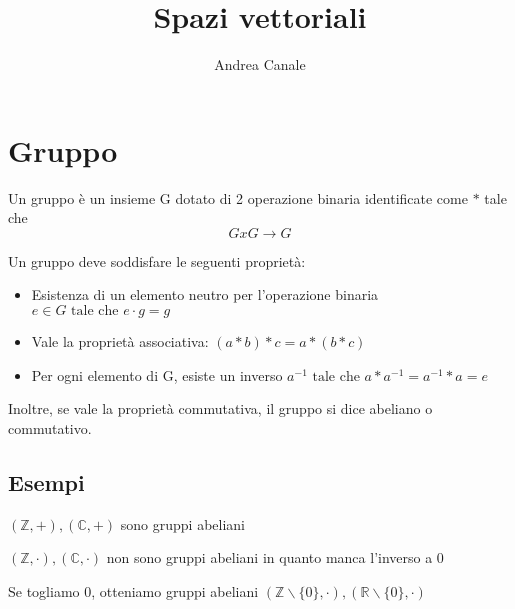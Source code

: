 \documentclass[a4paper, 10pt]{article}
\title{Spazi vettoriali}
\author{Andrea Canale}
\begin{document}
	
\maketitle
\tableofcontents



\section{Gruppo}

Un gruppo è un insieme G dotato di 2 operazione binaria identificate come $ * $ tale che $$ G x G \rightarrow G $$

Un gruppo deve soddisfare le seguenti proprietà:

\begin{itemize}
	\item Esistenza di un elemento neutro per l'operazione binaria $ e \in G \text{ tale che } e \cdot g = g$
	\item Vale la proprietà associativa: $ (a * b) * c = a * (b * c) $
	\item Per ogni elemento di G, esiste un inverso $ a^{-1} \text{ tale che } a * a^{-1} = a^{-1} * a = e $
\end{itemize}

Inoltre, se vale la proprietà commutativa, il gruppo si dice abeliano o commutativo.

\subsection{Esempi}

$ (\mathbb{Z}, +), (\mathbb{C}, +) $ sono gruppi abeliani

$ (\mathbb{Z}, \cdot), (\mathbb{C}, \cdot) $ non sono gruppi abeliani in quanto manca l'inverso a 0

Se togliamo 0, otteniamo gruppi abeliani $ (\mathbb{Z} \backslash \{0\}, \cdot), (\mathbb{R} \backslash \{0\}, \cdot) $
\end{document}
